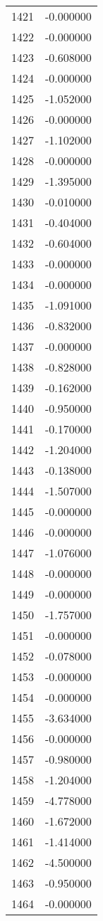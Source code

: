 \documentclass[12pt]{article}
\begin{document}
\begin{longtable}{@{}cc@{}}
1421 & -0.000000 \\
1422 & -0.000000 \\
1423 & -0.608000 \\
1424 & -0.000000 \\
1425 & -1.052000 \\
1426 & -0.000000 \\
1427 & -1.102000 \\
1428 & -0.000000 \\
1429 & -1.395000 \\
1430 & -0.010000 \\
1431 & -0.404000 \\
1432 & -0.604000 \\
1433 & -0.000000 \\
1434 & -0.000000 \\
1435 & -1.091000 \\
1436 & -0.832000 \\
1437 & -0.000000 \\
1438 & -0.828000 \\
1439 & -0.162000 \\
1440 & -0.950000 \\
1441 & -0.170000 \\
1442 & -1.204000 \\
1443 & -0.138000 \\
1444 & -1.507000 \\
1445 & -0.000000 \\
1446 & -0.000000 \\
1447 & -1.076000 \\
1448 & -0.000000 \\
1449 & -0.000000 \\
1450 & -1.757000 \\
1451 & -0.000000 \\
1452 & -0.078000 \\
1453 & -0.000000 \\
1454 & -0.000000 \\
1455 & -3.634000 \\
1456 & -0.000000 \\
1457 & -0.980000 \\
1458 & -1.204000 \\
1459 & -4.778000 \\
1460 & -1.672000 \\
1461 & -1.414000 \\
1462 & -4.500000 \\
1463 & -0.950000 \\
1464 & -0.000000 \\

\end{longtable}
\end{document}
